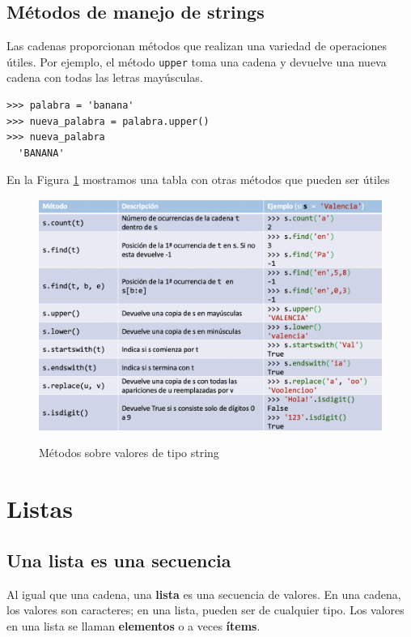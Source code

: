 \subsection{Métodos de manejo de strings}

Las cadenas proporcionan métodos que realizan una variedad de operaciones útiles. Por ejemplo, el
método \texttt{upper} toma una cadena y devuelve una nueva cadena con
todas las letras mayúsculas.


\begin{Verbatim}[frame=single]
>>> palabra = 'banana'
>>> nueva_palabra = palabra.upper()
>>> nueva_palabra
  'BANANA'
\end{Verbatim}

En la Figura \ref{metodos_string} mostramos una tabla con otras métodos que pueden ser útiles

\begin{figure}[t]
\includegraphics[width=\textwidth]{images/metodos-string.png}
\label{metodos_string}
\caption{Métodos sobre valores de tipo string}
\end{figure}



\section{Listas}

\subsection{Una lista es una secuencia}
\label{sequence}

Al igual que una cadena, una \textbf{ lista} es una secuencia de valores.  En una cadena, los
valores son caracteres; en una lista, pueden ser de cualquier tipo.  Los valores en
una lista se llaman \textbf{ elementos} o a veces \textbf{ ítems}.

